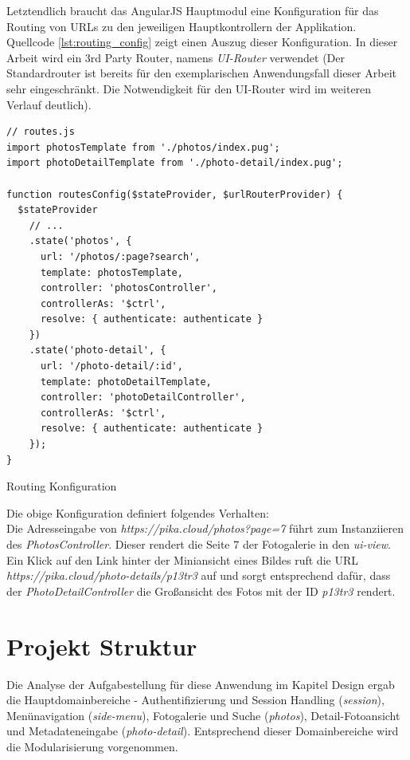 Letztendlich braucht das AngularJS Hauptmodul eine Konfiguration für das Routing von URLs zu den jeweiligen Hauptkontrollern der Applikation. Quellcode \ref{lst:routing_config} zeigt einen Auszug dieser Konfiguration. In dieser Arbeit wird ein 3rd Party Router, namens \emph{UI-Router} verwendet (Der Standardrouter ist bereits für den exemplarischen Anwendungsfall dieser Arbeit sehr eingeschränkt. Die Notwendigkeit für den UI-Router wird im weiteren Verlauf deutlich).

\begin{listing}[H]
\begin{verbatim}
// routes.js
import photosTemplate from './photos/index.pug';
import photoDetailTemplate from './photo-detail/index.pug';

function routesConfig($stateProvider, $urlRouterProvider) {
  $stateProvider
    // ...
    .state('photos', {
      url: '/photos/:page?search',
      template: photosTemplate,
      controller: 'photosController',
      controllerAs: '$ctrl',
      resolve: { authenticate: authenticate }
    })
    .state('photo-detail', {
      url: '/photo-detail/:id',
      template: photoDetailTemplate,
      controller: 'photoDetailController',
      controllerAs: '$ctrl',
      resolve: { authenticate: authenticate }
    });
}

\end{verbatim}
\caption{Routing Konfiguration}
\label{lst:routing_config}
\end{listing}

Die obige Konfiguration definiert folgendes Verhalten: \\
Die Adresseingabe von \emph{https://pika.cloud/photos?page=7} führt zum Instanziieren des \emph{PhotosController}. Dieser rendert die Seite 7 der Fotogalerie in den \emph{ui-view}. Ein Klick auf den Link hinter der Miniansicht eines Bildes ruft die URL \emph{https://pika.cloud/photo-details/p13tr3} auf und sorgt entsprechend dafür, dass der \emph{PhotoDetailController} die Großansicht des Fotos mit der ID  \emph{p13tr3} rendert.

\section{Projekt Struktur}
\label{sec:project_structure}

Die Analyse der Aufgabestellung für diese Anwendung im Kapitel Design ergab die Hauptdomainbereiche -  Authentifizierung und Session Handling (\emph{session}), Menünavigation (\emph{side-menu}), Fotogalerie und Suche (\emph{photos}), Detail-Fotoansicht und Metadateneingabe (\emph{photo-detail}). Entsprechend dieser Domainbereiche wird die Modularisierung vorgenommen.

